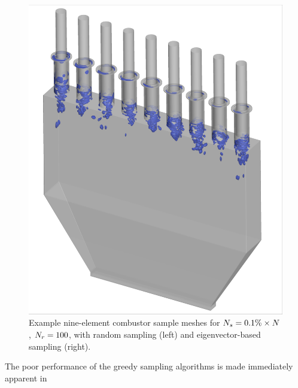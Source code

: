 \begin{figure}
\begin{minipage}{0.49\linewidth}
		\includegraphics[width=0.99\linewidth,trim={0.3em 0.3em 0.3em 0.3em},clip]{Chapters/HPROMResults/Images/nineElem/deim/iblank/eigenvec_iblank_iso.png}
	\end{minipage}
	\caption{\label{fig:nineElemIblankIso}Example nine-element combustor sample meshes for $N_s = 0.1\% \times N$, $N_r = 100$, with random sampling (left) and eigenvector-based sampling (right).}
\end{figure}

The poor performance of the greedy sampling algorithms is made immediately apparent in 

